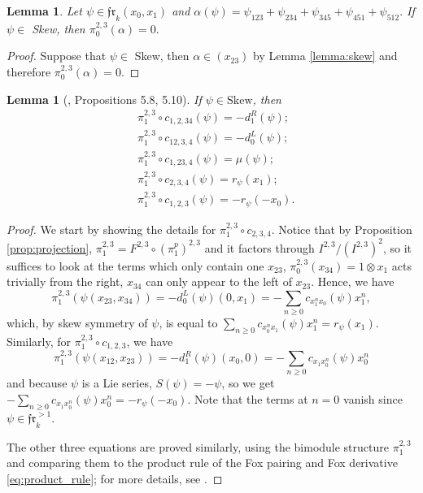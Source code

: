 \documentclass[a4paper,fleqn]{cas-sc}
\newtheorem{lemma}[theorem]{Lemma}
\newcommand{\fr}{\mathfrak{fr}}
\begin{document}
\begin{lemma}
\label{lemma:pi_0}
Let $\psi \in \mathfrak{fr}_k(x_0,x_1)$ and
$\alpha(\psi)=\psi_{123}+\psi_{234}+\psi_{345}+\psi_{451}+\psi_{512}.$
If $\psi \in$ Skew, then $\pi^{2,3}_0(\alpha)=0.$
\end{lemma}

\begin{proof}
Suppose that $\psi \in$ Skew, then $\alpha\in (x_{23})$ by Lemma \ref{lemma:skew} and therefore $\pi^{2,3}_0(\alpha)=0$. 

\end{proof}






\begin{lemma}[\cite{ANR}, Propositions 5.8, 5.10]
\label{lem:cab_23} If $\psi\in \mathrm{Skew}$, then
\begin{align*}
& \pi^{2,3}_1\circ c_{1,2,34}(\psi)=-d^R_1(\psi);\\
& \pi^{2,3}_1\circ c_{12,3,4}(\psi)=-d^L_0(\psi); \\
& \pi^{2,3}_1\circ c_{1,23,4}(\psi)=\mu(\psi);\\
& \pi^{2,3}_1\circ c_{2,3,4}(\psi)=r_{\psi}(x_1);\\
& \pi_1^{2,3}\circ c_{1,2,3}(\psi)=-r_{\psi}(-x_0).
\end{align*}
\end{lemma}

\begin{proof}
We start by showing the details for $\pi^{2,3}_1\circ c_{2,3,4}$. Notice that by Proposition \ref{prop:projection}, $\pi_1^{2,3}=F^{2,3}\circ (\pi^p_1)^{2,3}$ and it factors through $I^{2,3}/(I^{2,3})^2$, so it suffices to look at the terms which only contain one $x_{23}$, $\pi^{2,3}_0(x_{34})=1\otimes x_1$ acts trivially from the right, $x_{34}$ can only appear to the left of $x_{23}$. Hence, we have
$$
\pi^{2,3}_1(\psi(x_{23},x_{34}))=-d^L_0(\psi)(0,x_1)=-\sum_{n\ge 0}c_{x^n_1x_0}(\psi)x^n_1,
$$
which, by skew symmetry of $\psi$, is equal to $\sum_{n\ge 0}c_{x^n_0x_1}(\psi)x^n_1=r_{\psi}(x_1)$. Similarly, for $\pi_1^{2,3}\circ c_{1,2,3}$, we have
$$
\pi^{2,3}_1(\psi(x_{12},x_{23}))=-d^R_1(\psi)(x_0,0)=-\sum_{n\ge 0}c_{x_1x^n_0}(\psi)x^n_0
$$
and because $\psi$ is a Lie series, $S(\psi)=-\psi$, so we get $-\sum_{n\ge 0}c_{x_1x^n_0}(\psi)x_0^n=-r_{\psi}(-x_0)$. Note that the terms at $n=0$ vanish since $\psi \in \fr_k^{>1}$.

The other three equations are proved similarly, using the bimodule structure $\pi_1^{2,3}$ and comparing them to the product rule of the Fox pairing and Fox derivative \eqref{eq:product_rule}; for more details, see \cite{ANR}.
\end{proof}
\end{document}
